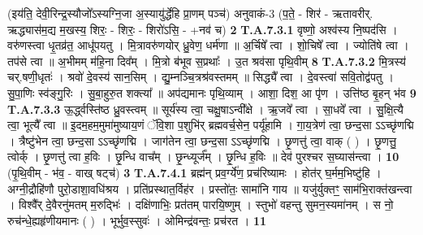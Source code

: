 \documentclass[17pt]{extarticle}
\begin{document}
                (इय॑ति॒ देवी॒रिन्द्र॒स्यौजो᳚ऽस्यग्नि॒जा अ॒स्यायु॑र्द्धेहि प्रा॒णम् पञ्च॑)  अनुवाकं-3 \newline
                                      (प॒ते॒ - शिर॑ - ऋतावरीर्. ऋद्ध्यास॑म॒द्य म॒खस्य॒ शिरः॒ - शिरः॒ - शिरो॑ऽसि॒ - +नव॑ च) \textbf{2} \newline \newline
                                \textbf{ T.A.7.3.1} \newline
                  वृष्णो॒ अश्व॑स्य नि॒ष्पद॑सि । वरु॑णस्त्वा धृ॒तव्र॑त॒ आधू॑पयतु । मि॒त्रावरु॑णयोर्  ध्रु॒वेण॒ धर्म॑णा ॥ अ॒र्चिषे᳚ त्वा । शो॒चिषे᳚ त्वा ।  ज्योति॑षे त्वा । तप॑से त्वा ॥ अ॒भीमम् म॑हि॒ना दिव᳚म् ।  मि॒त्रो ब॑भूव स॒प्रथाः᳚ । उ॒त श्रव॑सा पृथि॒वीम् \textbf{ 8} \newline
                  \newline
                                                                  \textbf{ T.A.7.3.2} \newline
                  मि॒त्रस्य॑ चर्.षणी॒धृतः॑ ।  श्रवो॑ दे॒वस्य॑ सान॒सिम् । द्यु॒म्नञ्चि॒त्रश्र॑वस्तमम् ॥ सिद्ध्यै᳚ त्वा । दे॒वस्त्वा॑ सवि॒तोद्व॑पतु ।  सु॒पा॒णिः स्व॑ङ्गु॒रिः । सु॒बा॒हुरु॒त शक्त्या᳚ ॥ अप॑द्यमानः पृथि॒व्याम् । आशा॒ दिश॒ आ पृ॑ण । उत्ति॑ष्ठ बृ॒हन् भ॑व \textbf{ 9} \newline
                  \newline
                                                                  \textbf{ T.A.7.3.3} \newline
                  ऊ॒र्द्ध्वस्ति॑ष्ठ ध्रु॒वस्त्वम् ॥ सूर्य॑स्य त्वा॒ चक्षु॒षाऽन्वी᳚क्षे । ऋ॒जवे᳚ त्वा । सा॒धवे᳚ त्वा । सु॒क्षि॒त्यै त्वा॒ भूत्यै᳚ त्वा ॥  इ॒दम॒हम॒मुमा॑मुष्याय॒णं ॅवि॒शा प॒शुभि॑र् ब्रह्मवर्च॒सेन॒ पर्यू॑हामि ।  गा॒य॒त्रेण॑ त्वा॒ छन्द॒सा ऽऽच्छृ॑णद्मि । त्रैष्टु॑भेन त्वा॒ छन्द॒सा ऽऽच्छृ॑णद्मि ।  जाग॑तेन त्वा॒ छन्द॒सा ऽऽच्छृ॑णद्मि । छृ॒णत्तु॑ त्वा॒ वाक् ( ) । छृ॒णत्तु॒ त्वोर्क् । छृ॒णत्तु॑ त्वा ह॒विः ।  छृ॒न्धि वाच᳚म् । छृ॒न्ध्यूर्ज᳚म् । छृ॒न्धि ह॒विः ॥  देव॑ पुरश्चर स॒घ्यास॑न्त्वा । \textbf{ 10} \newline
                  \newline
                                                        (पृ॒थि॒वीम् - भ॑व॒ - वाख् षट्च॑) \textbf{3} \newline \newline
                                \textbf{ T.A.7.4.1} \newline
                  ब्रह्म॑न् प्रव॒र्ग्ये॑ण॒ प्रच॑रिष्यामः ।  होत॑र् घ॒र्मम॒भिष्टु॑हि । अग्नी॒द्रौहि॑णौ पुरो॒डाशा॒वधि॑श्रय । प्रति॑प्रस्थात॒र्विह॑र ।  प्रस्तो॑तः॒ सामा॑नि गाय ॥ यजु॑र्युक्तꣳ॒॒ साम॑भि॒राक्त॑खन्त्वा । विश्वै᳚र् दे॒वैरनु॑मतम् म॒रुद्भिः॑ । दक्षि॑णाभिः॒ प्रत॑तम् पारयि॒ष्णुम् ।  स्तुभो॑ वहन्तु सुमन॒स्यमा॑नम् । स नो॒ रुच॑न्धे॒ह्यहृ॑णीयमानः ( ) । भूर्भुव॒स्सुवः॑ ।  ओमिन्द्र॑वन्तः॒ प्रच॑रत । \textbf{ 11} \newline
\end{document}
